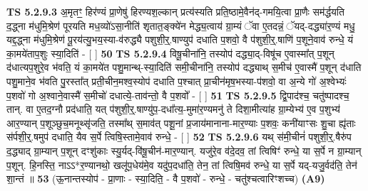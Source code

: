 \documentclass[17pt]{extarticle}
\begin{document}
                  \newline
                                \textbf{ TS 5.2.9.3} \newline
                  अ॒मृतꣳ॒॒ हिर॑ण्यं प्रा॒णेषु॑ हिरण्यश॒ल्कान् प्रत्य॑स्यति प्रति॒ष्ठामे॒वैन॑द्-गमयि॒त्वा प्रा॒णैः सम॑र्द्धयति द॒द्ध्ना म॑धुमि॒श्रेण॑ पूरयति मध॒व्यो॑ऽसा॒नीति॑ शृतात॒ङ्क्ये॑न मेद्ध्य॒त्वाय॑ ग्रा॒म्यं ॅवा ए॒तदन्नं॒ ॅयद्-दद्ध्या॑र॒ण्यं मधु॒ यद्द॒द्ध्ना म॑धुमि॒श्रेण॑ पू॒रय॑त्यु॒भय॒स्या-व॑रुद्ध्यै पशुशी॒र्॒.षाण्युप॑ दधाति प॒शवो॒ वै प॑शुशी॒र्॒.षाणि॑ प॒शूने॒वाव॑ रुन्धे॒ यं का॒मये॑ताप॒शुः स्या॒दिति॑ - [  ] \textbf{  50 } \newline
                  \newline
                                \textbf{ TS 5.2.9.4} \newline
                  विषू॒चीना॑नि॒ तस्योप॑ दद्ध्या॒द्-विषू॑च ए॒वास्मा᳚त् प॒शून् द॑धात्यप॒शुरे॒व भ॑वति॒ यं का॒मये॑त पशु॒मान्थ्-स्या॒दिति॑ समी॒चीना॑नि॒ तस्योप॑ दद्ध्याथ् स॒मीच॑ ए॒वास्मै॑ प॒शून् द॑धाति पशु॒माने॒व भ॑वति पु॒रस्ता᳚त् प्रती॒चीन॒मश्व॒स्योप॑ दधाति प॒श्चात् प्रा॒चीन॑मृष॒भस्या-प॑शवो॒ वा अ॒न्ये गो॑ अ॒श्वेभ्यः॑ प॒शवो॑ गो अ॒श्वाने॒वास्मै॑ स॒मीचो॑ दधात्ये॒-ताव॑न्तो॒ वै प॒शवो᳚ - [  ] \textbf{  51} \newline
                  \newline
                                \textbf{ TS 5.2.9.5} \newline
                  द्वि॒पाद॑श्च॒ चतु॑ष्पादश्च॒ तान्. वा ए॒तद॒ग्नौ प्रद॑धाति॒ यत् प॑शुशी॒र्॒.षाण्यु॑प॒-दधा᳚त्य॒-मुमा॑र॒ण्यमनु॑ ते दिशा॒मीत्या॑ह ग्रा॒म्येभ्य॑ ए॒व प॒शुभ्य॑ आर॒ण्यान् प॒शूञ्छुच॒मनूथ्सृ॑जति॒ तस्मा᳚थ् स॒माव॑त् पशू॒नां प्र॒जाय॑मानाना-मार॒ण्याः प॒शवः॒ कनी॑याꣳसः शु॒चा ह्यृ॑ताः स॑र्पशी॒र्॒.षमुप॑ दधाति॒ यैव स॒र्पे त्विषि॒स्तामे॒वाव॑ रुन्धे॒ - [  ] \textbf{  52} \newline
                  \newline
                                \textbf{ TS 5.2.9.6} \newline
                  यथ् स॑मी॒चीनं॑ पशुशी॒र्॒.षैरु॑प द॒द्ध्याद् ग्रा॒म्यान् प॒शून् दꣳशु॑काः स्यु॒र्यद्-वि॑षू॒चीन॑-मार॒ण्यान्. यजु॑रे॒व व॑दे॒दव॒ तां त्विषिꣳ॑ रुन्धे॒ या स॒र्पे न ग्रा॒म्यान् प॒शून्. हि॒नस्ति॒ नाऽऽ*र॒ण्यानथो॒ खलू॑प॒धेय॑मे॒व यदु॑प॒दधा॑ति॒ तेन॒ तां त्विषि॒मव॑ रुन्धे॒ या स॒र्पे यद्-यजु॒र्वद॑ति॒ तेन॑ शा॒न्तं ॥ \textbf{  53} \newline
                  \newline
                      (ऊ॒नान्तस्योप॑ - प्रा॒णाः - स्या॒दिति॒ - वै प॒शवो॑ - रुन्धे॒ - चतु॑श्चत्वारिꣳशच्च)  \textbf{(A9)} \newline \newline
\end{document}
